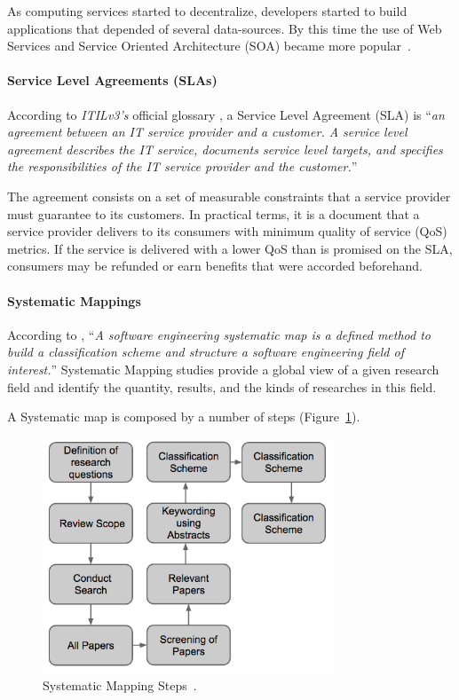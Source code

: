 \documentclass[conference, 10pt, a4paper]{IEEEtran}
\begin{document}
As computing services started to decentralize, developers started to build applications that depended of several data-sources. 
By this time the use of Web Services and Service Oriented Architecture (SOA) became more popular~\cite{Armbrust09m.:above}. 


\paragraph*{Service Level Agreements (SLAs)}
According to \textit{ITILv3's} official glossary \cite{itilv3glossary}, a Service Level Agreement (SLA) is ``\textit{an agreement between an IT service provider and a customer. 
A service level agreement describes the IT service, documents service level targets, and specifies the responsibilities of the IT service provider and the customer.}'' 

The agreement consists on a set of measurable constraints that a service provider must guarantee to its customers.
In practical terms, it is a document that a service provider delivers to its consumers with minimum quality of service (QoS) metrics. 
If the service is delivered with a lower QoS than is promised on the SLA, consumers may be refunded or earn benefits that were accorded beforehand.    

\paragraph*{Systematic Mappings}
According to \cite{Petersen:2008:SMS:2227115.2227123}, ``\textit{A software engineering systematic map is a defined method to build a classification scheme and structure a software engineering field of interest.}''
Systematic Mapping studies provide a global view of a given research field and identify the quantity, results, and the kinds of researches in this field.

A Systematic map is composed by a number of steps (Figure~\ref{fig:sms}).
\begin{figure}[ht!]
\centering
\includegraphics[height=70mm]{pic1.png}
\caption{Systematic Mapping Steps~\cite{Petersen:2008:SMS:2227115.2227123}.\label{fig:sms}}
\end{figure}
\end{document}
